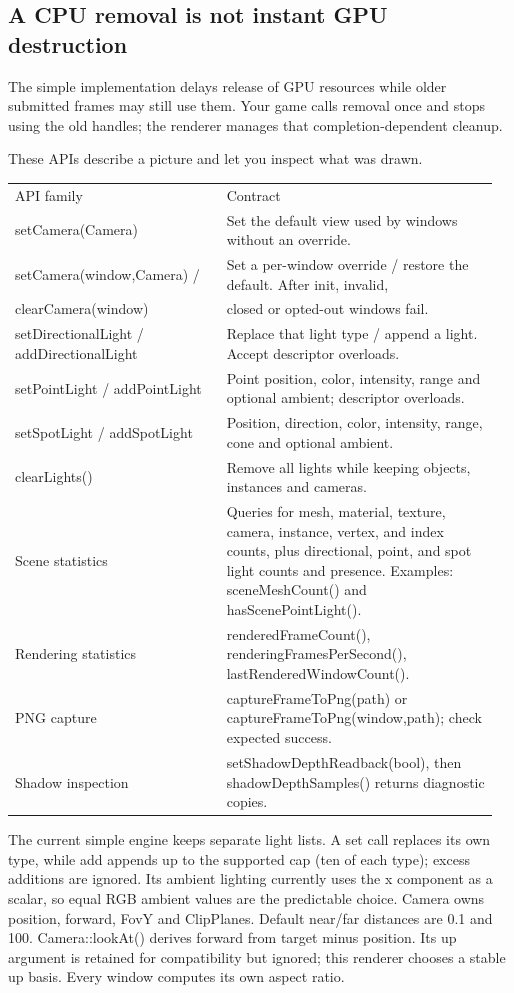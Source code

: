\documentclass[11pt,a4paper]{article}
\begin{document}
\subsection*{A CPU removal is not instant GPU destruction}
The simple implementation delays release of GPU resources while older submitted frames may still use them. Your game calls removal once and stops using the old handles; the renderer manages that completion-dependent cleanup.

\label{core-17}
These APIs describe a picture and let you inspect what was drawn.

{\small
\begin{longtable}{@{}p{0.42\linewidth}p{0.54\linewidth}@{}}
API family & Contract \\
setCamera(Camera) & Set the default view used by windows without an override. \\
setCamera(window,Camera) / & Set a per-window override / restore the default. After init, invalid, \\
clearCamera(window) & closed or opted-out windows fail. \\
setDirectionalLight / addDirectionalLight & Replace that light type / append a light. Accept descriptor overloads. \\
setPointLight / addPointLight & Point position, color, intensity, range and optional ambient; descriptor overloads. \\
setSpotLight / addSpotLight & Position, direction, color, intensity, range, cone and optional ambient. \\
clearLights() & Remove all lights while keeping objects, instances and cameras. \\
Scene statistics & Queries for mesh, material, texture, camera, instance, vertex, and index counts, plus directional, point, and spot light counts and presence. Examples: sceneMeshCount() and hasScenePointLight(). \\
Rendering statistics & renderedFrameCount(), renderingFramesPerSecond(), lastRenderedWindowCount(). \\
PNG capture & captureFrameToPng(path) or captureFrameToPng(window,path); check expected success. \\
Shadow inspection & setShadowDepthReadback(bool), then shadowDepthSamples() returns diagnostic copies. \\
\end{longtable}
}

The current simple engine keeps separate light lists. A set call replaces its own type, while add appends up to the supported cap (ten of each type); excess additions are ignored. Its ambient lighting currently uses the x component as a scalar, so equal RGB ambient values are the predictable choice. Camera owns position, forward, FovY and ClipPlanes. Default near/far distances are 0.1 and 100. Camera::lookAt() derives forward from target minus position. Its up argument is retained for compatibility but ignored; this renderer chooses a stable up basis. Every window computes its own aspect ratio.
\end{document}
